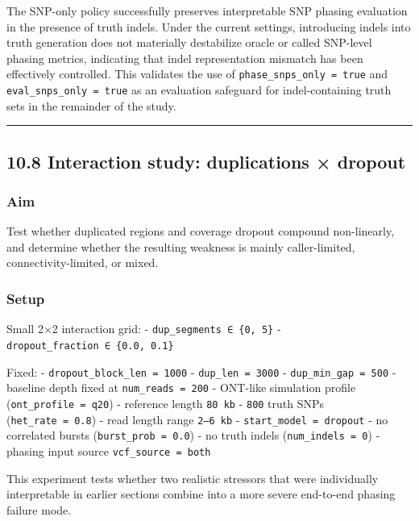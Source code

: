 \documentclass[
]{article}
\begin{document}
The SNP-only policy successfully preserves interpretable SNP phasing
evaluation in the presence of truth indels. Under the current settings,
introducing indels into truth generation does not materially destabilize
oracle or called SNP-level phasing metrics, indicating that indel
representation mismatch has been effectively controlled. This validates
the use of \texttt{phase\_snps\_only\ =\ true} and
\texttt{eval\_snps\_only\ =\ true} as an evaluation safeguard for
indel-containing truth sets in the remainder of the study.

\begin{center}\rule{0.5\linewidth}{0.5pt}\end{center}

\subsection{10.8 Interaction study: duplications ×
dropout}\label{interaction-study-duplications-dropout}

\subsubsection{Aim}\label{aim-6}

Test whether duplicated regions and coverage dropout compound
non-linearly, and determine whether the resulting weakness is mainly
caller-limited, connectivity-limited, or mixed.

\subsubsection{Setup}\label{setup-6}

Small 2×2 interaction grid: - \texttt{dup\_segments\ ∈\ \{0,\ 5\}} -
\texttt{dropout\_fraction\ ∈\ \{0.0,\ 0.1\}}

Fixed: - \texttt{dropout\_block\_len\ =\ 1000} -
\texttt{dup\_len\ =\ 3000} - \texttt{dup\_min\_gap\ =\ 500} - baseline
depth fixed at \texttt{num\_reads\ =\ 200} - ONT-like simulation profile
(\texttt{ont\_profile\ =\ q20}) - reference length \texttt{80\ kb} -
\texttt{800} truth SNPs (\texttt{het\_rate\ =\ 0.8}) - read length range
\texttt{2–6\ kb} - \texttt{start\_model\ =\ dropout} - no correlated
bursts (\texttt{burst\_prob\ =\ 0.0}) - no truth indels
(\texttt{num\_indels\ =\ 0}) - phasing input source
\texttt{vcf\_source\ =\ both}

This experiment tests whether two realistic stressors that were
individually interpretable in earlier sections combine into a more
severe end-to-end phasing failure mode.
\end{document}
